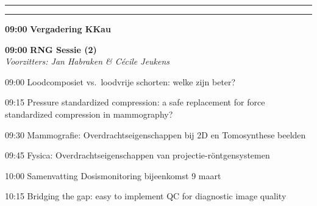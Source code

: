 \documentclass[a4paper,10pt]{report}
\begin{document}
\begin{multicols*}{3}

\vfill\vspace{5cm}\strut


\columnbreak
\hrule\vspace{2mm}
\vspace{2mm}\hrule\strut

\begin{packed_enum}
\item[\textbf{09:00}] \textbf{Vergadering KKau}
\end{packed_enum} %

\vfill

\begin{packed_enum}
\item[\textbf{09:00}] \textbf{RNG Sessie (2)}\\\textit{Voorzitters: Jan Habraken \& C\'ecile Jeukens}
\item[09:00] Loodcomposiet vs.\ loodvrije schorten: welke zijn beter? 
\item[09:15] Pressure standardized compression: a safe replacement for force standardized compression in mammography? 
\item[09:30] Mammografie: Overdrachtseigenschappen bij 2D en Tomo\-synthese beelden 
\item[09:45] Fysica: Overdrachtseigenschappen van projectie-rönt\-gen\-systemen
\item[10:00] Samenvatting Dosismonitoring bijeenkomst 9 maart
\item[10:15] Bridging the gap: easy to implement QC for diagnostic image quality 
\end{packed_enum} %

\vfill


\end{multicols*}
\end{document}
